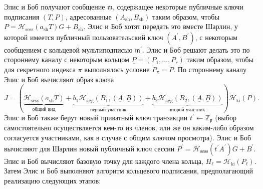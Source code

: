 \documentclass{mrl}
\theoremstyle{definition}
\numberwithin{theorem}{subsection}
\newcommand{\scalarField}{\mathbb{Z}_{\mathfrak{p}}}
\newcommand{\m}{\mathfrak{m}}
\begin{document}
Элис и Боб получают сообщение $\m$, содержащее некоторые публичные ключи подписания $(T,P)$, адресованные $(A_{\text{sh}},B_{\text{sh}})$ таким образом, чтобы $P = \mathcal{H}_{\text{sess}}(a_{\text{sh}} T)G + B_{\text{sh}}$. Элис и Боб хотят передать это вместе Шарлин, у которой имеется публичный пользовательский ключ $(A^\prime, B^\prime)$, с некоторым сообщением с кольцевой мультиподписью $\m^\prime$. Элис и Боб решают делать это по стороннему каналу с некоторым кольцом $\underline{P} = (P_1, \ldots, P_r)$ таким образом, чтобы для секретного индекса $\pi$ выполнялось условие $P_\pi = P$. По стороннему каналу Элис и Боб вычисляют образ ключа
\[J = \left(\underbrace{\mathcal{H}_{\text{sess}}(a_{\text{sh}} T)}_{\text{общий вид}} + \underbrace{b_1\mathcal{H}_{\text{agg}}(B_1, (\underline{A}, \underline{B}))}_{\text{первый участник}} + \underbrace{b_2\mathcal{H}_{\text{agg}}(B_2, (\underline{A}, \underline{B}))}_{\text{второй участник}}\right)\mathcal{H}_{\text{ki}}(P).\] Элис и Боб также берут новый приватный ключ транзакции $t^{\prime} \leftarrow \scalarField$ (выбор самостоятельно осуществляется кем-то из членов, или же он каким-либо образом согласуется участниками, как в случае с общим ключом просмотра). Элис и Боб вычисляют для Шарлин новый публичный ключ сессии $P^{\prime} = \mathcal{H}_{\text{sess}}(t^{\prime} A^{\prime})G + B^\prime$. Элис и Боб вычисляют базовую точку для каждого члена кольца, $H_\ell = \mathcal{H}_{\text{ki}}(P_\ell)$. Затем Элис и Боб выполняют алгоритм кольцевого подписания, предполагающий реализацию следующих этапов:
\end{document}
